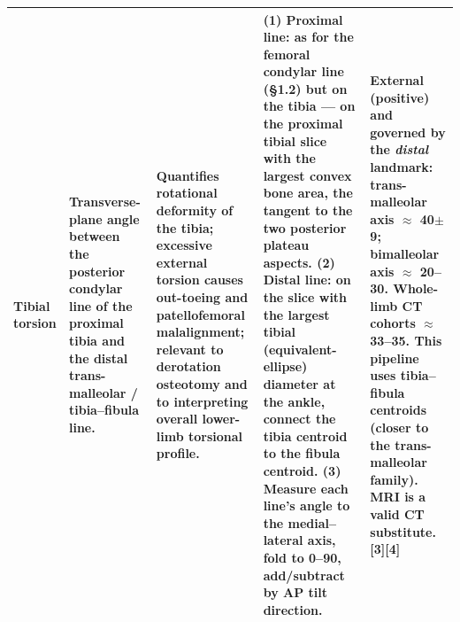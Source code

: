 \documentclass[10pt]{article}
\begin{document}
\begin{footnotesize}
\begin{longtable}{L{2.5cm} L{4.0cm} L{4.0cm} L{9.2cm} L{5.4cm}}
\textbf{Tibial torsion} &
Transverse-plane angle between the posterior condylar line of the proximal tibia and
the distal trans-malleolar / tibia--fibula line. &
Quantifies rotational deformity of the tibia; excessive external torsion causes
out-toeing and patellofemoral malalignment; relevant to derotation osteotomy and to
interpreting overall lower-limb torsional profile. &
(1) \textbf{Proximal line:} as for the femoral condylar line (\S1.2) but on the tibia
--- on the proximal tibial slice with the largest convex bone area, the tangent to the
two posterior plateau aspects. (2) \textbf{Distal line:} on the slice with the largest
tibial (equivalent-ellipse) diameter at the ankle, connect the tibia centroid to the
fibula centroid. (3) Measure each line's angle to the medial--lateral axis, fold to
0--90\textdegree{}, add/subtract by AP tilt direction. &
External (positive) and governed by the \emph{distal} landmark: trans-malleolar axis
$\approx$ \textbf{40\textdegree{}$\pm$9\textdegree{}}; bimalleolar axis $\approx$
\textbf{20--30\textdegree{}}. Whole-limb CT cohorts $\approx$ 33--35\textdegree{}. This
pipeline uses tibia--fibula centroids (closer to the trans-malleolar family). MRI is a
valid CT substitute. [3][4] \\
\midrule


\end{longtable}
\end{footnotesize}
\end{document}
